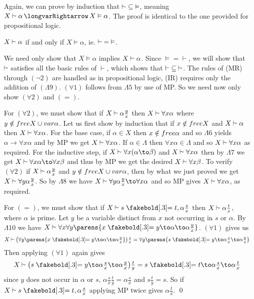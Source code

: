 Again, we can prove by induction that ${\vsim}\subseteq{\vDash}$, meaning $X\vsim\alpha\implies X\vDash\alpha$.
The proof is identical to the one provided for propositional logic.

\bthrm[title=The Completeness Theorem for $\vsim$, name=vsimcompletenesstheorem]

    $X\vsim\alpha$ if and only if $X\vDash\alpha$, ie. ${\vsim}={\vDash}$.

\ethrm

We need only show that $X\vDash\alpha$ implies $X\vsim\alpha$.
Since ${\vDash}={\vdash}$, we will show that $\vsim$ satisfies all the basic rules of $\vdash$, which shows that ${\vdash}\subseteq{\vsim}$.
The rules of (MR) through $(\neg2)$ are handled as in propositional logic, (IR) requires only the addition of $(\Lambda9)$.
$(\forall1)$ follows from $\Lambda5$ by use of MP.
So we need now only show $(\forall2)$ and $(=)$.

For $(\forall2)$, we must show that if $X\vsim\alpha\frac yx$ then $X\vsim\forall x\alpha$ where $y\notin{\sl free} X\cup{\sl var}\alpha$.
Let us first show by induction that if $x\notin{\sl free} X$ and $X\vsim\alpha$ then $X\vsim\forall x\alpha$.
For the base case, if $\alpha\in X$ then $x\notin{\sl free}\alpha$ and so $\Lambda6$ yields $\alpha\to\forall x\alpha$ and by MP we get $X\vsim\forall x\alpha$.
If $\alpha\in\Lambda$ then $\forall x\alpha\in\Lambda$ and so $X\vsim\forall x\alpha$ as required.
For the inductive step, if $X\vsim\forall x(\alpha\to\beta)$ and $X\vsim\forall x\alpha$ then by $\Lambda7$ we get $X\vsim\forall x\alpha\to\forall x\beta$ and thus by MP we get the desired
$X\vsim\forall x\beta$.
To verify $(\forall2)$ if $X\vsim\alpha\frac yx$ and $y\notin{\sl free} X\cup{\sl var}\alpha$, then by what we just proved we get $X\vsim\forall y\alpha\frac yx$.
So by $\Lambda8$ we have $X\vsim\forall y\alpha\frac yx\to\forall x\alpha$ and so MP gives $X\vsim\forall x\alpha$, as required.

For $(=)$, we must show that if $X\vsim s\eq t,\alpha\frac sx$ then $X\vsim\alpha\frac tx$, where $\alpha$ is prime.
Let $y$ be a variable distinct from $x$ not occurring in $s$ or $\alpha$.
By $\Lambda10$ we have $X\vsim\forall x\forall y\parens{x\eq y\to\alpha\to\alpha\frac yx}$.
$(\forall1)$ gives us
$$ X\vsim\bigl(\forall y\parens{x\eq y\to\alpha\to\alpha\tfrac yx}\bigr)\tfrac sx = \forall y\parens{s\eq y\to\alpha\tfrac sx\to\alpha\tfrac yx} $$
Then applying $(\forall1)$ again gives
$$ X\vsim\bigl(s\eq y\to\alpha\tfrac sx\to\alpha\tfrac yx\bigr)\tfrac ty = s\eq t\to\alpha\tfrac sx\to\alpha\tfrac tx $$
since $y$ does not occur in $\alpha$ or $s$, $\alpha\tfrac sx\tfrac ty=\alpha\tfrac sx$ and $s\tfrac ty=s$.
So if $X\vsim s\eq t,\alpha\tfrac sx$ applying MP twice gives $\alpha\tfrac tx$.
\qed

